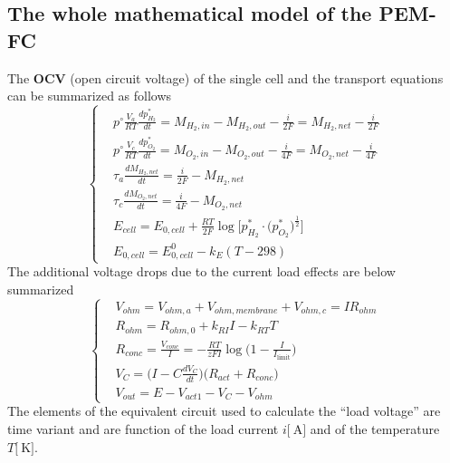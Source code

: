 \documentclass[11pt,a4paper]{article}
\numberwithin{equation}{section}
\theoremstyle{it}
\theoremstyle{definition}
\begin{document}
\subsection{The whole mathematical model of the PEM-FC}
\begin{mybox}
The \textbf{OCV} (open circuit voltage) of the single cell and the transport equations can be summarized as follows
\begin{equation}
\left\lbrace \begin{aligned}
	&	p^\circ\frac{V_a}{RT}\frac{dp_{H_2}^*}{dt} = M_{H_2,in} - M_{H_2,out} - \frac{i}{2F} = M_{H_2,net} - \frac{i}{2F} \\[8pt]
	&	p^\circ\frac{V_c}{RT}\frac{dp_{O_2}^*}{dt} = M_{O_2,in} - M_{O_2,out} - \frac{i}{4F} = M_{O_2,net} - \frac{i}{4F} \\[8pt]
	&	\tau_{a}\frac{dM_{H_2,net}}{dt} = \frac{i}{2F} - M_{H_2,net} \\[8pt]
	&	\tau_{c}\frac{dM_{O_2,net}}{dt} = \frac{i}{4F} - M_{O_2,net} \\[8pt]
	&	E_{cell} = E_{0,cell} + \frac{RT}{2F}\log\Bigg[{p_{H_2}^*\cdot\Big(p_{O_2}^*\Big)^{\frac{1}{2}}}\Bigg] \\[8pt]
	&	E_{0,cell} = E_{0,cell}^0 - k_E(T-298)
\end{aligned}\right. 
\end{equation}
The additional voltage drops due to the current load effects are below summarized
\begin{equation}
\left\lbrace \begin{aligned}
		&	V_{ohm} = V_{ohm,a} + V_{ohm,membrane} + V_{ohm,c} = IR_{ohm} \\[8pt]
		&	R_{ohm} = R_{ohm,0} + k_{RI}I - k_{RT}T \\[8pt]
		&	R_{conc}=\frac{V_{conc}}{I}=-\frac{RT}{zFI}\log\Big(1-\frac{I}{I_{\text{limit}}}\Big) \\[8pt]
		&	V_{C}=\Big(I-C\frac{dV_C}{dt}\Big)\big(R_{act}+R_{conc}\big) \\[8pt]
		&	V_{out} = E - V_{act1} - V_C - V_{ohm}
	\end{aligned}\right. 
\end{equation}
The elements of the equivalent circuit used to calculate the “load voltage” are time variant and are function of the load current $i\Big[\SI{}{\ampere}\Big]$ and of the temperature $T\Big[\SI{}{\kelvin}\Big]$.
\end{mybox}
\end{document}
